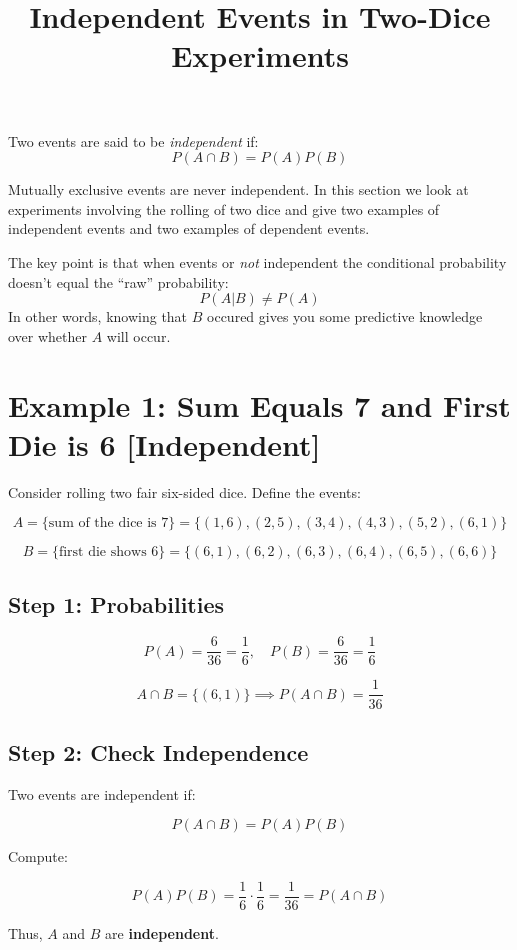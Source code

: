 \documentclass[12pt]{article}
\title{Independent Events in Two-Dice Experiments}
\author{}
\date{}
\begin{document}
\maketitle

\Large

Two events are said to be \emph{independent} if:
\[ P(A \cap B) = P(A)P(B)\]

Mutually exclusive events are never independent. In this section we look at experiments involving the rolling of two dice and give two examples of independent events and two examples of dependent events.

The key point is that when events or \emph{not} independent the conditional probability doesn't equal the ``raw'' probability:
\[ P(A | B) \neq P(A) \]
In other words, knowing that $B$ occured gives you some predictive knowledge over whether $A$ will occur.


\section*{Example 1: Sum Equals 7 and First Die is 6 [Independent]}

Consider rolling two fair six-sided dice. Define the events:

\[
A = \{\text{sum of the dice is 7}\} = \{(1,6),(2,5),(3,4),(4,3),(5,2),(6,1)\}
\]

\[
B = \{\text{first die shows 6}\} = \{(6,1),(6,2),(6,3),(6,4),(6,5),(6,6)\}
\]

\subsection*{Step 1: Probabilities}

\[
P(A) = \frac{6}{36} = \frac{1}{6}, \quad
P(B) = \frac{6}{36} = \frac{1}{6}
\]

\[
A \cap B = \{(6,1)\} \implies P(A \cap B) = \frac{1}{36}
\]

\subsection*{Step 2: Check Independence}

Two events are independent if:

\[
P(A \cap B) = P(A)P(B)
\]

Compute:

\[
P(A)P(B) = \frac{1}{6} \cdot \frac{1}{6} = \frac{1}{36} = P(A \cap B)
\]

Thus, \(A\) and \(B\) are \textbf{independent}.
\end{document}
